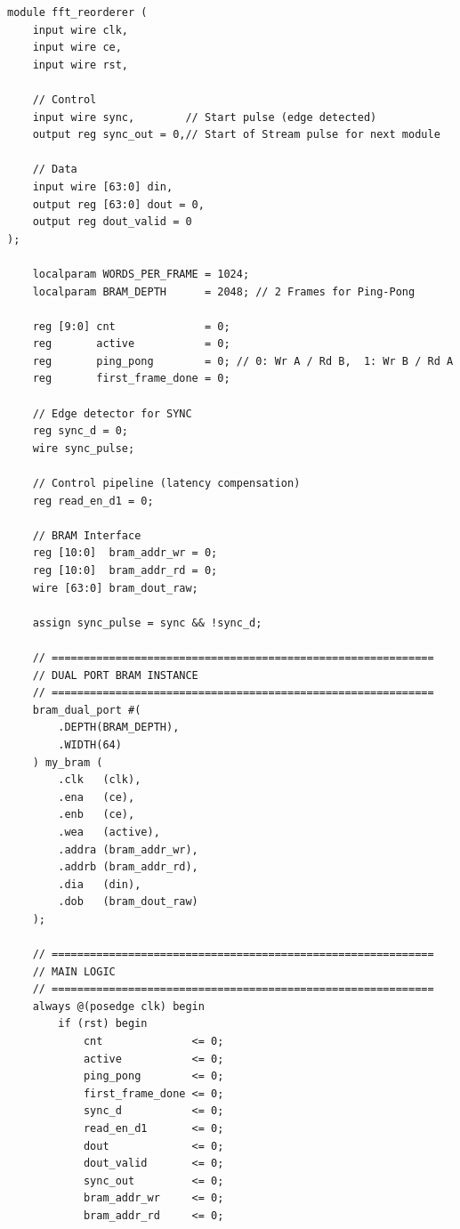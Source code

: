 \begin{lstlisting}[style={prettyverilog}, caption={Verilog code for FFT reorder module.}, label={lst:verilog_fft_reorder}]
module fft_reorderer (
    input wire clk,
    input wire ce,          
    input wire rst,         
    
    // Control
    input wire sync,        // Start pulse (edge detected)
    output reg sync_out = 0,// Start of Stream pulse for next module
    
    // Data
    input wire [63:0] din,
    output reg [63:0] dout = 0,
    output reg dout_valid = 0
);

    localparam WORDS_PER_FRAME = 1024;
    localparam BRAM_DEPTH      = 2048; // 2 Frames for Ping-Pong

    reg [9:0] cnt              = 0;
    reg       active           = 0;
    reg       ping_pong        = 0; // 0: Wr A / Rd B,  1: Wr B / Rd A
    reg       first_frame_done = 0;

    // Edge detector for SYNC
    reg sync_d = 0;
    wire sync_pulse;

    // Control pipeline (latency compensation)
    reg read_en_d1 = 0;

    // BRAM Interface
    reg [10:0]  bram_addr_wr = 0;
    reg [10:0]  bram_addr_rd = 0;
    wire [63:0] bram_dout_raw;

    assign sync_pulse = sync && !sync_d;

    // ============================================================
    // DUAL PORT BRAM INSTANCE
    // ============================================================
    bram_dual_port #(
        .DEPTH(BRAM_DEPTH),
        .WIDTH(64)
    ) my_bram (
        .clk   (clk),
        .ena   (ce),
        .enb   (ce),
        .wea   (active),
        .addra (bram_addr_wr),
        .addrb (bram_addr_rd),
        .dia   (din),
        .dob   (bram_dout_raw)
    );

    // ============================================================
    // MAIN LOGIC
    // ============================================================
    always @(posedge clk) begin
        if (rst) begin
            cnt              <= 0;
            active           <= 0;
            ping_pong        <= 0;
            first_frame_done <= 0;
            sync_d           <= 0;
            read_en_d1       <= 0;
            dout             <= 0;
            dout_valid       <= 0;
            sync_out         <= 0;
            bram_addr_wr     <= 0;
            bram_addr_rd     <= 0;
            

\end{lstlisting}
